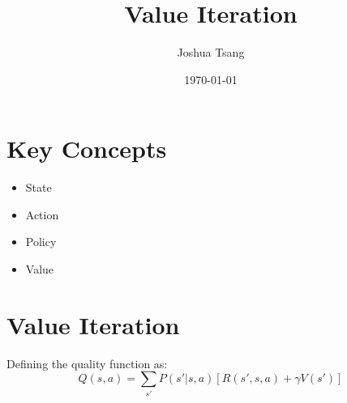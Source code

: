 \documentclass[a4paper,11pt]{article}
\title{Value Iteration}
\author{Joshua Tsang}
\date{\today}
\begin{document}
\maketitle
\tableofcontents

\section{Key Concepts}

\begin{itemize}
    \item State
    \item Action
    \item Policy
    \item Value
  \end{itemize}

\section{Value Iteration}

Defining the quality function as:
\begin{equation} \label{eqn:quality_function_Q}
    Q(s,a) = \sum_{s'} P(s'|s,a) \left[ R(s',s,a) + \gamma V(s') \right]
\end{equation}
\end{document}
